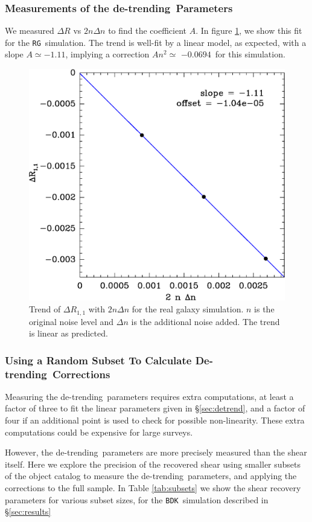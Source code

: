 \documentclass[iop]{emulateapj}
\newcommand{\detrend}{de-trending}
\newcommand{\Detrend}{De-trending}
\newcommand{\Aslope}{$-1.11$}
\newcommand{\Rcorr}{$-0.0694$}
\newcommand{\bdksim}{\texttt{BDK}}
\newcommand{\rgsim}{\texttt{RG}}
\begin{document}
\subsubsection{Measurements of the \detrend\ Parameters}

We measured $\Delta R$ vs $2 n \Delta n$ to find the
coefficient $A$.  In figure \ref{fig:detrend}, we show this fit for the \rgsim\
simulation.  The trend is well-fit by a linear model, as expected, with a slope
$A \simeq $\Aslope, implying a correction $A n^2 \simeq$ \Rcorr\ for this
simulation.

\begin{figure}
	\centering
    \includegraphics[width=0.5\columnwidth]{mcal-v14s01-Rnoise-detrend-R11.eps}

    \caption{Trend of $\Delta R_{1,1}$ with $2 n \Delta n$ for the
        real galaxy simulation.   $n$ is the
    original noise level and $\Delta n$ is the additional noise added.  The
    trend is linear as predicted.}

\label{fig:detrend}
\end{figure}




\subsubsection{Using a Random Subset To Calculate \Detrend\ Corrections}

Measuring the \detrend\ parameters requires extra computations, at least a
factor of three to fit the linear parameters given in \S \ref{sec:detrend}, and
a factor of four if an additional point is used to check for possible
non-linearity. These extra computations could be expensive for large surveys.  

However, the \detrend\ parameters are more precisely measured than the shear
itself.  Here we explore the precision of the recovered shear using smaller
subsets of the object catalog to measure the \detrend\ parameters, and
applying the corrections to the full sample.  In Table \ref{tab:subsets}
we show the shear recovery parameters for various subset sizes, for the
\bdksim\ simulation described in \S \ref{sec:results}
\end{document}
